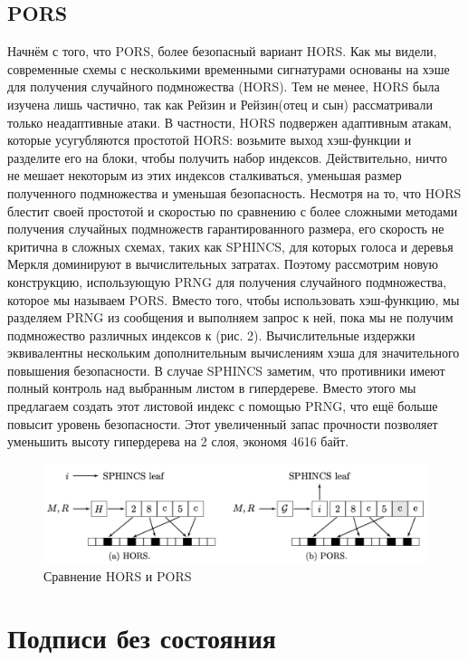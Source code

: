 \documentclass[a4paper, 14pt]{extarticle}
\begin{document}
\subsection{PORS}
Начнём с того, что PORS, более безопасный вариант HORS. Как мы видели, современные схемы с несколькими временными сигнатурами основаны на хэше для получения случайного подмножества (HORS). Тем не менее, HORS была изучена лишь частично, так как Рейзин и Рейзин(отец и сын) рассматривали только неадаптивные атаки. В частности, HORS подвержен адаптивным атакам, которые усугубляются простотой HORS: возьмите выход хэш-функции и разделите его на блоки, чтобы получить набор индексов. Действительно, ничто не мешает некоторым из этих индексов сталкиваться, уменьшая размер полученного подмножества и уменьшая безопасность. Несмотря на то, что HORS блестит своей простотой и скоростью по сравнению с более сложными методами получения случайных подмножеств гарантированного размера, его скорость не критична в сложных схемах, таких как SPHINCS, для которых голоса и деревья Меркля доминируют в вычислительных затратах. Поэтому рассмотрим новую конструкцию, использующую PRNG для получения случайного подмножества, которое мы называем PORS. Вместо того, чтобы использовать хэш-функцию, мы разделяем PRNG из сообщения и выполняем запрос к ней, пока мы не получим подмножество различных индексов к (рис. 2). Вычислительные издержки эквивалентны нескольким дополнительным вычислениям хэша для значительного повышения безопасности. В случае SPHINCS заметим, что противники имеют полный контроль над выбранным листом в гипердереве. Вместо этого мы предлагаем создать этот листовой индекс с помощью PRNG, что ещё больше повысит уровень безопасности. Этот увеличенный запас прочности позволяет уменьшить высоту гипердерева на 2 слоя, экономя 4616 байт.

\begin{figure}[h]
    \centering
    \includegraphics[scale=0.85]{PORS.png}
    \caption{Сравнение HORS и PORS}
\end{figure}
\newpage

\section{Подписи без состояния}
\end{document}
